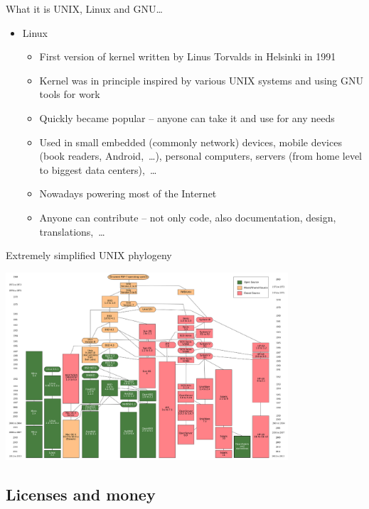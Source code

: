 \documentclass[compress, ucs, xelatex, 11pt, xcolor=svgnames,
  hyperref={
    bookmarks=true,
    unicode=true,
    colorlinks=true,
    pdftitle={Linux, command line and MetaCentrum},
    plainpages=false,
    pdfauthor={Vojtech Zeisek},
    pdfsubject={Course about use of Linux command line, writing shell scripts and using MetaCentrum of CESNET},
    pdfcreator={XeLaTeX},
    pdfkeywords={Linux, GNU, BASH, shell, command line, MetaCentrum},
    linkcolor=Red,
    anchorcolor=Blue,
    citecolor=Purple,
    filecolor=DodgerBlue,
    menucolor=DarkOrchid,
    urlcolor=DeepSkyBlue,
    pdftex},
  url={hyphens, lowtilde} %
  ]{beamer}
\begin{document}
\begin{frame}[allowframebreaks]{What it is UNIX, Linux and GNU\ldots}
\begin{itemize}
\begin{itemize}
    \item Source code is free -- anyone can study it (Security!), report bugs, contribute, modify, share it,~\ldots
    \item GNU General Public License (GPL) -- free spirit of open-source -- license, idea, how to share software
  \end{itemize}
  \item Linux
  \begin{itemize}
    \item First version of kernel written by Linus Torvalds in Helsinki in 1991
    \item Kernel was in principle inspired by various UNIX systems and using GNU tools for work
    \item Quickly became popular -- anyone can take it and use for any needs
    \item Used in small embedded (commonly network) devices, mobile devices (book readers, Android,~\ldots), personal computers, servers (from home level to biggest data centers),~\ldots
    \item Nowadays powering most of the Internet
    \item Anyone can contribute -- not only code, also documentation, design, translations,~\ldots
  \end{itemize}
\end{itemize}
\end{frame}

\begin{frame}{Extremely simplified UNIX phylogeny}
\begin{center}
  \includegraphics[height=7cm]{unix_history-simple.png}
\end{center}
\end{frame}

\subsection{Licenses and money}
\end{document}
